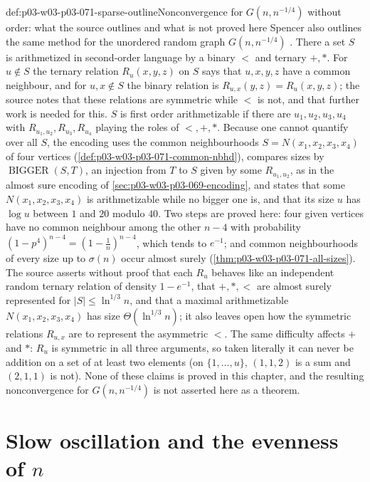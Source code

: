 \begin{proofboundary}{def:p03-w03-p03-071-sparse-outline}{Nonconvergence for \(G(n,n^{-1/4})\) without order: what the source outlines and what is not proved here}
Spencer also outlines the same method for the unordered random graph
\(G(n,n^{-1/4})\) \cite[p.~24]{Spencer2007LogicRandomStructuresAuthor}.
There a set \(S\) is arithmetized in second-order language by a binary
\(<\) and ternary \(+,\ast\).  For \(u\notin S\) the ternary relation
\(R_u(x,y,z)\) on \(S\) says that \(u,x,y,z\) have a common neighbour, and
for \(u,x\notin S\) the binary relation is \(R_{u,x}(y,z)=R_u(x,y,z)\); the
source notes that these relations are symmetric while \(<\) is not, and that
further work is needed for this.  \(S\) is first order arithmetizable if
there are \(u_1,u_2,u_3,u_4\) with \(R_{u_1,u_2},R_{u_3},R_{u_4}\) playing the
roles of \(<,+,\ast\).  Because one cannot quantify over all \(S\), the
encoding uses the common neighbourhoods \(S=N(x_1,x_2,x_3,x_4)\) of four
vertices (\cref{def:p03-w03-p03-071-common-nbhd}), compares sizes by \(\operatorname{BIGGER}(S,T)\), an injection
from \(T\) to \(S\) given by some \(R_{u_1,u_2}\), as in the almost sure
encoding of \cref{sec:p03-w03-p03-069-encoding}, and states that some
\(N(x_1,x_2,x_3,x_4)\) is arithmetizable while no bigger one is, and that
its size \(u\) has \(\log u\) between \(1\) and \(20\) modulo \(40\).  Two
steps are proved here: four given vertices have no common neighbour among
the other \(n-4\) with probability \((1-p^4)^{n-4}=(1-\frac1n)^{n-4}\), which
tends to \(e^{-1}\); and common neighbourhoods of every size up to
\(\sigma(n)\) occur almost surely (\cref{thm:p03-w03-p03-071-all-sizes}).
The source asserts without proof that each \(R_u\) behaves like an
independent random ternary relation of density \(1-e^{-1}\), that
\(+,\ast,<\) are almost surely represented for \(|S|\leq\ln^{1/3}n\), and
that a maximal arithmetizable \(N(x_1,x_2,x_3,x_4)\) has size
\(\Theta(\ln^{1/3}n)\); it also leaves open how the symmetric relations
\(R_{u,x}\) are to represent the asymmetric \(<\).  The same difficulty
affects \(+\) and \(\ast\): \(R_u\) is symmetric in all three arguments, so
taken literally it can never be addition on a set of at least two elements
(on \(\{1,\ldots,u\}\), \((1,1,2)\) is a sum and \((2,1,1)\) is not).  None of these claims is
proved in this chapter, and the resulting nonconvergence for
\(G(n,n^{-1/4})\) is not asserted here as a theorem.
\end{proofboundary}

\section{Slow oscillation and the evenness of \(n\)}
\label{sec:p03-w03-p03-071-evenness}

